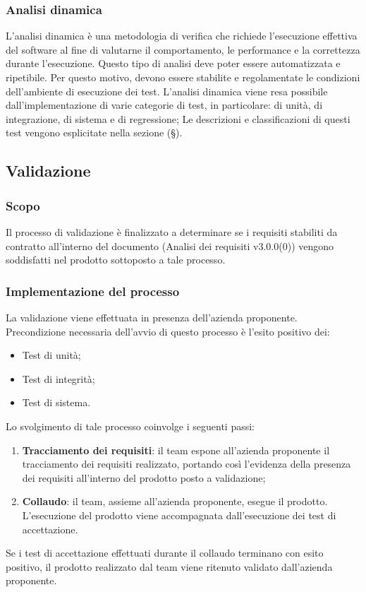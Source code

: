 \documentclass[10pt, a4paper]{article}
\begin{document}
\subsubsection{Analisi dinamica}
L'analisi dinamica è una metodologia di verifica che richiede l'esecuzione effettiva del software al fine di valutarne il comportamento, le performance e la correttezza durante l'esecuzione.
Questo tipo di analisi deve poter essere automatizzata e ripetibile. Per questo motivo, devono essere stabilite e regolamentate le condizioni dell'ambiente di esecuzione dei test. 
L'analisi dinamica viene resa possibile dall'implementazione di varie categorie di test, in particolare: di unità, di integrazione, di sistema e di regressione; Le descrizioni e classificazioni  di questi test vengono esplicitate nella sezione (\S {}).



\subsection{Validazione}
\subsubsection{Scopo}
Il processo di validazione è finalizzato a determinare se i requisiti stabiliti da contratto all'interno del documento (Analisi dei requisiti v3.0.0(0)) vengono soddisfatti nel 
prodotto sottoposto a tale processo.

\subsubsection{Implementazione del processo}
La validazione viene effettuata in presenza dell'azienda proponente.\\
Precondizione necessaria dell'avvio di questo processo è l'esito positivo dei:
\begin{itemize}
    \item Test di unità;
    \item Test di integrità;
    \item Test di sistema.
\end{itemize}
Lo svolgimento di tale processo coinvolge i seguenti passi:
\begin{enumerate}
    \item \textbf{Tracciamento dei requisiti}: il team espone all'azienda proponente il tracciamento dei requisiti realizzato, portando così 
    l'evidenza della presenza dei requisiti all'interno del prodotto posto a validazione;
    \item \textbf{Collaudo}: il team, assieme all'azienda proponente, esegue il prodotto. L'esecuzione del prodotto viene accompagnata 
    dall'esecuzione dei test di accettazione.
\end{enumerate}
Se i test di accettazione effettuati durante il collaudo terminano con esito positivo, il prodotto realizzato dal team viene ritenuto validato dall'azienda proponente.
\end{document}
